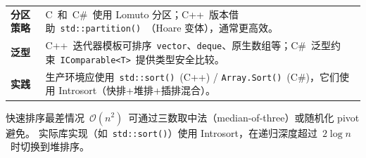 \documentclass[12pt,a4paper,fontset=fandol]{ctexbook}
\newcommand{\bigO}[1]{\mathcal{O}(#1)}
\newcommand{\Fn}[1]{\texttt{#1()}}
\newcommand{\Tp}[1]{\texttt{#1}}
\begin{document}
\begin{compare}
\begin{tabularx}{\textwidth}{l>{\raggedright\arraybackslash}X}
  \textbf{分区策略} & C~和~C\#~使用 Lomuto 分区；C++~版本借助~\Fn{std::partition}~（Hoare 变体），通常更高效。\\
  \textbf{泛型} & C++~迭代器模板可排序~\Tp{vector}、\Tp{deque}、原生数组等；C\#~泛型约束~\Tp{IComparable<T>}~提供类型安全比较。\\
  \textbf{实践} & 生产环境应使用~\Fn{std::sort}~(C++) / \Fn{Array.Sort}~(C\#)，它们使用 Introsort（快排+堆排+插排混合）。\\
\end{tabularx}
\end{compare}

\begin{warning}
快速排序最差情况~$\bigO{n^2}$~可通过三数取中法（median-of-three）或随机化 pivot 避免。
实际库实现（如~\Fn{std::sort}）使用 Introsort，在递归深度超过~$2\log n$~时切换到堆排序。
\end{warning}
\end{document}
